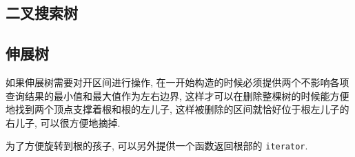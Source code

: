 

\clearpage
\subsection{二叉搜索树}


\clearpage
\subsection{伸展树}
如果伸展树需要对开区间进行操作, 在一开始构造的时候必须提供两个不影响各项查询结果的最小值和最大值作为左右边界, 这样才可以在删除整棵树的时候能方便地找到两个顶点支撑着根和根的左儿子, 这样被删除的区间就恰好位于根左儿子的右儿子, 可以很方便地摘掉.

为了方便旋转到根的孩子, 可以另外提供一个函数返回根部的 \lstinline{iterator}.


